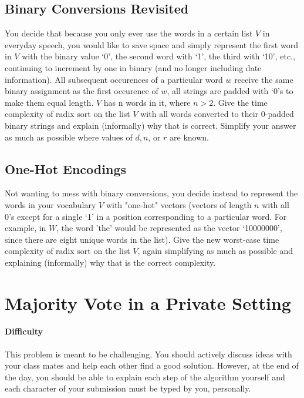 \documentclass [12pt]{article}
\begin{document}

\subsection{Binary Conversions Revisited }
You decide that because you only ever use the words in a certain list $V$ in everyday speech, you would like to save space and simply represent the first word in $V$ with the binary value `0', the second word with `1', the third with `10', etc., continuing to increment by one in binary (and no longer including date information). All subsequent occurences of a particular word $w$ receive the same binary assignment as the first occurence of $w$, all strings are padded with `0's to make them equal length. $V$ has n words in it, where $n > 2$. Give the time complexity of radix sort on the list $V$ with all words converted to their $0$-padded binary strings and explain (informally) why that is correct. Simplify your answer as much as possible where values of $d, n$, or $r$ are known.


\subsection{One-Hot Encodings } 
Not wanting to mess with binary conversions, you decide instead to represent the words in your vocabulary $V$ with "one-hot" vectors (vectors of length $n$ with all 0's except for a single `1' in a position corresponding to a particular word. For example, in $W$, the word ’the’ would be represented as the vector `10000000', since there are eight unique words in the list). Give the new worst-case time complexity of radix sort on the list $V$, again simplifying as much as possible and explaining (informally) why that is the correct complexity.



\pagebreak
\section{Majority Vote in a Private Setting } 
\begin {Instruction} 

\paragraph{Difficulty} This problem is meant to be challenging. You should actively discuss ideas with your class mates and help each other find a good solution. However, at the end of the day, you should be able to explain each step of the algorithm yourself and each character of your submission must be typed by you, personally.
\end {Instruction} 
\end{document}
